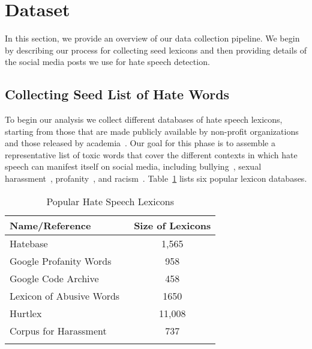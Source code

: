 \section{Dataset}
In this section, we provide an overview of our data collection pipeline.
We begin by describing our process for collecting seed lexicons and then providing details of the social media posts we use for hate speech detection.

\subsection{Collecting Seed List of Hate Words}

To begin our analysis we collect different databases of hate speech lexicons, starting from those that are made publicly available by non-profit organizations~\cite{google-profanity-words-node,hatebase,badwordslist} and those released by academia~\cite{rezvan2018quality,Bassignana2018HurtlexAM,Wiegand2018InducingAL}. 
Our goal for this phase is to assemble a representative list of toxic words that cover the different contexts in which hate speech can manifest itself on social media, including bullying~\cite{rezvan2018quality}, sexual harassment~\cite{razi2020lets,nagar2021holistic}, profanity~\cite{google-profanity-words-node}, and racism~\cite{hatebase}.
Table~\ref{tab:lexicons} lists six popular lexicon databases.

\begin{table}[ht]
	\begin{center}
	\small\begin{tabular}{lc}
		\toprule
		\textbf{Name/Reference} & \textbf{Size of Lexicons}\\
		\midrule
		Hatebase~\cite{hatebase} & 1,565 \\
		Google Profanity Words~\cite{google-profanity-words-node} & 958 \\
		Google Code Archive~\cite{badwordslist} & 458 \\
            Lexicon of Abusive Words~\cite{Wiegand2018InducingAL} & 1650 \\ 
		Hurtlex ~\cite{Bassignana2018HurtlexAM} & 11,008 \\ 
		Corpus for Harassment~\cite{rezvan2018quality} & 737\\
		\bottomrule \\
	\end{tabular}    
        \caption{Popular Hate Speech Lexicons}
        \label{tab:lexicons}
\end{center}
\end{table}

